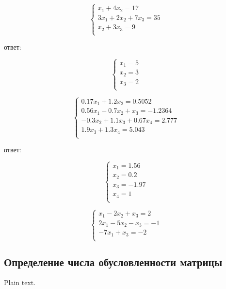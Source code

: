 \documentclass{article}
\begin{document}
\begin{equation}\label{4th}
\left\{ \begin{array}{ll}
  x_{1} + 4x_{2} = 17\\
  3x_{1} + 2x_{2} + 7x_{3} = 35\\
  x_{2} + 3x_{3} = 9\\
\end{array} \right.
\end{equation}

ответ:

\begin{equation}\label{4th}
\left\{ \begin{array}{ll}
  x_{1} = 5\\
  x_{2} = 3\\
  x_{3} = 2\\
\end{array} \right.
\end{equation}

\begin{equation}\label{5th}
\left\{ \begin{array}{ll}
  0.17x_{1} + 1.2x_{2} = 0.5052\\
  0.56x_{1} - 0.7x_{2} + x_{3} = -1.2364\\
  -0.3x_{2} + 1.1x_{3} + 0.67x_{4} = 2.777\\
  1.9x_{3} + 1.3x_{4} = 5.043\\
\end{array} \right.
\end{equation}

ответ:

\begin{equation}\label{4th}
\left\{ \begin{array}{ll}
  x_{1} = 1.56\\
  x_{2} = 0.2\\
  x_{3} = -1.97\\
  x_{4} = 1\\
\end{array} \right.
\end{equation}

\begin{equation}\label{6th}
\left\{ \begin{array}{ll}
x_{1} - 2x_{2} + x_{3} = 2\\
2x_{1} - 5x_{2} - x_{3} = -1\\
-7x_{1} + x_{3} = -2\\
\end{array} \right.
\end{equation}

\subsection{Определение числа обусловленности матрицы}

Plain text.
\end{document}
